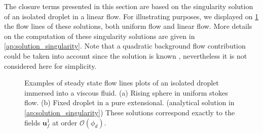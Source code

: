 The closure terms presented in this section are based on the singularity solution of an isolated droplet in a linear flow. 
For illustrating purposes, we displayed on \ref{fig:flowlines} the flow lines of these solutions, both uniform flow and linear flow. 
More details on the computation of these singularity solutions are given in \ref{ap:solution_singularity}. 
Note that a quadratic background flow contribution could be taken into account since the solution is known \citep{nadim1991motion}, nevertheless it is not considered here for simplicity. 
\begin{figure}[h!]
    \centering
    \caption{Examples of steady state flow lines plots of an isolated droplet immersed into a viscous fluid. 
    (a) Rising sphere in uniform stokes flow. 
    (b) Fixed droplet in a pure extensional.
    (analytical solution in \ref{ap:solution_singularity})
    These solutions correspond exactly to the fields $\textbf{u}_f^1$ at order $\mathcal{O}(\phi_d)$.}
    \label{fig:flowlines}
\end{figure}


